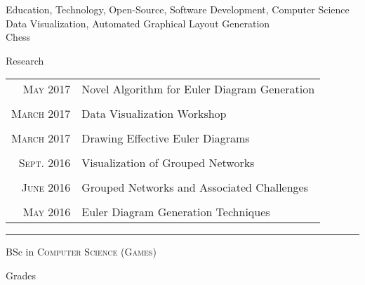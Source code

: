 \documentclass[a4paper,10pt]{article} %
\begin{document}
Education, Technology, Open-Source, Software Development, Computer Science\\
Data Visualization, Automated Graphical Layout Generation\\
Chess\\
\bigskip

\pagebreak


\par{\centering\Large \hypertarget{papers}{Research}\par}

\begin{center}
\begin{tabular}{rl}
\textsc{May} 2017 & Novel Algorithm for Euler Diagram Generation \\
\\
\textsc{March} 2017 & Data Visualization Workshop \\
\\
\textsc{March} 2017 & Drawing Effective Euler Diagrams \\
\\
\textsc{Sept.} 2016 & Visualization of Grouped Networks \\
\\
\textsc{June} 2016 & Grouped Networks and Associated Challenges \\
\\
\textsc{May} 2016 & Euler Diagram Generation Techniques \\
\end{tabular}
\end{center}
\bigskip
\hrule
\vspace{1cm}


\par{\centering\Large \hypertarget{grds}{BSc in \textsc{Computer Science (Games)}}\par}\large{\centering Grades\par}\normalsize
\end{document}
